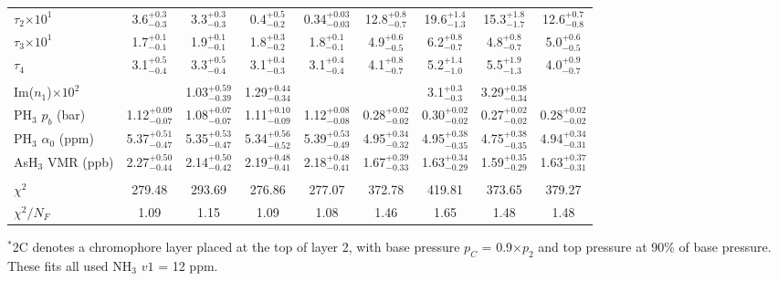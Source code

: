 \documentclass[article,11pt]{emulateapj}
\def\asht{AsH$_3$ }
\def\pht{PH$_3$ }
\def\nht{NH$_3$ }
\begin{document}
\begin{table*}[!htb]
\begin{footnotesize}
\begin{tabular}{|l | c c c c | c c c c|}
    $\tau_2$$\times 10^1$ &   3.6$^{+  0.3}_{-  0.3}$ &    3.3$^{+ 0.3}_{-0.3}$ &   0.4$^{+ 0.5}_{- 0.2}$ &   0.34$^{+0.03}_{- 0.03}$ &  12.8$^{+ 0.8}_{- 0.7}$ &  19.6$^{+1.4}_{-1.3}$  &  15.3$^{+ 1.8}_{- 1.7}$ &   12.6$^{+ 0.7}_{- 0.8}$\\[0.05in]
    $\tau_3$$\times 10^1$ &   1.7$^{+  0.1}_{-  0.1}$ &   1.9$^{+ 0.1}_{- 0.1}$ &   1.8$^{+ 0.3}_{- 0.2}$ &   1.8$^{+ 0.1}_{- 0.1}$ &   4.9$^{+ 0.6}_{- 0.5}$ &   6.2$^{+ 0.8}_{- 0.7}$ &   4.8$^{+ 0.8}_{- 0.7}$ &   5.0$^{+ 0.6}_{- 0.5}$\\[0.05in]
                 $\tau_4$ &   3.1$^{+  0.5}_{-  0.4}$ &   3.3$^{+ 0.5}_{- 0.4}$ &   3.1$^{+ 0.4}_{- 0.3}$ &   3.1$^{+ 0.4}_{- 0.4}$ &   4.1$^{+ 0.8}_{- 0.7}$ &   5.2$^{+ 1.4}_{- 1.0}$ &   5.5$^{+ 1.9}_{- 1.3}$ &   4.0$^{+ 0.9}_{- 0.7}$\\[0.05in]
\hline\\[-0.1in]
   Im($n_1$)$\times 10^2$ & & 1.03$^{+0.59}_{-0.39}$ & 1.29$^{+0.44}_{-0.34}$ & & & 3.1$^{+0.3}_{-0.3}$ &  3.29$^{+0.38}_{-0.34}$&\\[0.05in]
    \pht $p_b$ (bar) &  1.12$^{+ 0.09}_{- 0.07}$ &  1.08$^{+0.07}_{-0.07}$ &  1.11$^{+0.10}_{-0.09}$ &  1.12$^{+0.08}_{-0.08}$ &  0.28$^{+0.02}_{-0.02}$ &  0.30$^{+0.02}_{-0.02}$ &  0.27$^{+0.02}_{-0.02}$ &  0.28$^{+0.02}_{-0.02}$\\[0.05in]
  \pht $\alpha_0$    (ppm) &  5.37$^{+ 0.51}_{- 0.47}$ &  5.35$^{+0.53}_{-0.47}$ &  5.34$^{+0.56}_{-0.52}$ &  5.39$^{+0.53}_{-0.49}$ &  4.95$^{+0.34}_{-0.32}$ &  4.95$^{+0.38}_{-0.35}$ &  4.75$^{+0.38}_{-0.35}$ &  4.94$^{+0.34}_{-0.31}$\\[0.05in]
    \asht VMR (ppb) &  2.27$^{+ 0.50}_{- 0.44}$ &  2.14$^{+0.50}_{-0.42}$ &  2.19$^{+0.48}_{-0.41}$ &  2.18$^{+0.48}_{-0.41}$ &  1.67$^{+0.39}_{-0.33}$ &  1.63$^{+0.34}_{-0.29}$ &  1.59$^{+0.35}_{-0.29}$ &  1.63$^{+0.37}_{-0.31}$\\[0.05in]
\hline\\[-0.1in]
$\chi^2$ & 279.48 & 293.69 & 276.86 & 277.07 & 372.78 & 419.81 & 373.65 & 379.27 \\[0.05in]
$\chi^2/N_F$ &   1.09 &   1.15 &   1.09 &   1.08 &   1.46 &   1.65 &   1.48 &   1.48\\[0.05in]
\hline%
\end{tabular}
\end{footnotesize}
\parbox[c]{6in}{$^*$2C denotes a chromophore layer placed at the top of layer 2, with base pressure $p_{C}$ = 0.9$\times p_2$ and top pressure at 90\% of base pressure.  These fits all used \nht$v1$ = 12 ppm.}
\end{table*}
\end{document}
